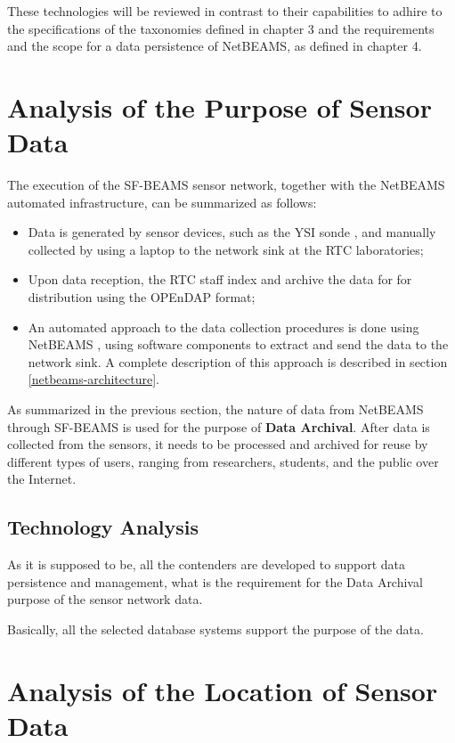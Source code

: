 These technologies will be reviewed in contrast to their capabilities to adhire
to the specifications of the taxonomies defined in chapter 3 and the
requirements and the scope for a data persistence of NetBEAMS, as defined in
chapter 4.

\section{Analysis of the Purpose of Sensor Data}

The execution of the SF-BEAMS sensor network, together with the NetBEAMS
automated infrastructure, can be summarized as follows:

\begin{itemize}
  \item Data is generated by sensor devices, such as the YSI sonde
  \cite{YSI-Sonde}, and manually collected by using a laptop to the network
  sink at the RTC laboratories;
  \item Upon data reception, the RTC staff index and archive the data for
  for distribution using the OPEnDAP format;
  \item An automated approach to the data collection procedures is done
  using NetBEAMS \cite{netbeams2009}, using software components to extract and
  send the data to the network sink. A complete description of this approach
  is described in section \ref{netbeams-architecture}.
\end{itemize}

As summarized in the previous section, the nature of data from NetBEAMS through
SF-BEAMS is used for the purpose of \textbf{Data Archival}. After data is
collected from the sensors, it needs to be processed and archived for reuse by
different types of users, ranging from researchers, students, and the public
over the Internet.

\subsection{Technology Analysis}

As it is supposed to be, all the contenders are developed to support data
persistence and management, what is the requirement for the Data Archival
purpose of the sensor network data.

Basically, all the selected database systems support the purpose of the data.

\section{Analysis of the Location of Sensor Data}
\label{sec:sn-data-location}

